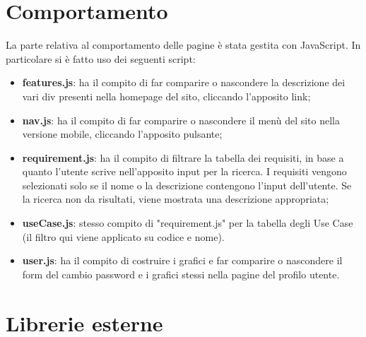 \section{Comportamento}
La parte relativa al comportamento delle pagine è stata gestita con JavaScript. In particolare si è fatto uso dei seguenti script:
\begin{itemize}
	\item \textbf{features.js}: ha il compito di far comparire o nascondere la descrizione dei vari div presenti nella homepage del sito, cliccando l'apposito link;
	\item \textbf{nav.js}: ha il compito di far comparire o nascondere il menù del sito nella versione mobile, cliccando l'apposito pulsante;
	\item \textbf{requirement.js}: ha il compito di filtrare la tabella dei requisiti, in base a quanto l'utente scrive nell'apposito input per la ricerca. I requisiti vengono selezionati solo se il nome o la descrizione contengono l'input dell'utente. Se la ricerca non da risultati, viene mostrata una descrizione appropriata;
	\item \textbf{useCase.js}: stesso compito di "requirement.js" per la tabella degli Use Case (il filtro qui viene applicato su codice e nome).
	\item \textbf{user.js}: ha il compito di costruire i grafici e far comparire o nascondere il form del cambio password e i grafici stessi nella pagine del profilo utente.
\end{itemize}

\section{Librerie esterne}
